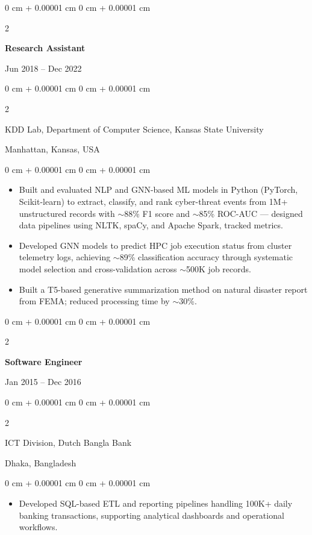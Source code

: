 \documentclass[10pt, letterpaper]{article}
\newenvironment{highlights}{
    \begin{itemize}[
        topsep=0.10 cm,
        parsep=0.10 cm,
        partopsep=0pt,
        itemsep=0pt,
        leftmargin=0 cm + 10pt
    ]
}{
    \end{itemize}
} %
\newenvironment{onecolentry}{
    \begin{adjustwidth}{
        0 cm + 0.00001 cm
    }{
        0 cm + 0.00001 cm
    }
}{
    \end{adjustwidth}
} %
\newenvironment{twocolentry}[2][]{
    \onecolentry
    \def\secondColumn{#2}
    \setcolumnwidth{\fill, 4.5 cm}
    \begin{paracol}{2}
}{
    \switchcolumn \raggedleft \secondColumn
    \end{paracol}
    \endonecolentry
} %
\begin{document}
    \vspace{1mm}

    \begin{twocolentry}{Jun 2018 -- Dec 2022}
        \textbf{Research Assistant}
    \end{twocolentry}
    \begin{twocolentry}{Manhattan, Kansas, USA}
       KDD Lab, Department of Computer Science, Kansas State University
    \end{twocolentry}
    \vspace{0.10 cm}
    \begin{onecolentry}
        \begin{highlights}
            \item Built and evaluated NLP and GNN-based ML models in Python (PyTorch, Scikit-learn) to extract, classify, and rank cyber-threat events from 1M+ unstructured records with $\sim$88\% F1 score and $\sim$85\% ROC-AUC — designed data pipelines using NLTK, spaCy, and Apache Spark, tracked metrics.   
            \item Developed GNN models to predict HPC job execution status from cluster telemetry logs, achieving $\sim$89\% classification accuracy through systematic model selection and cross-validation across $\sim$500K job records.
            \item Built a T5-based generative summarization method on natural disaster report from FEMA; reduced processing time by $\sim$30\%.
            
        \end{highlights}
    \end{onecolentry}

    \vspace{0.1 cm}
    \begin{twocolentry}{Jan 2015 -- Dec 2016}
        \textbf{Software Engineer}
    \end{twocolentry}
    \begin{twocolentry}{Dhaka, Bangladesh}
       ICT Division, Dutch Bangla Bank
    \end{twocolentry}

    \begin{onecolentry}
        \begin{highlights}
            \item Developed SQL-based ETL and reporting pipelines handling 100K+ daily banking transactions, supporting analytical dashboards and operational workflows.
        \end{highlights}
    \end{onecolentry}
\end{document}
